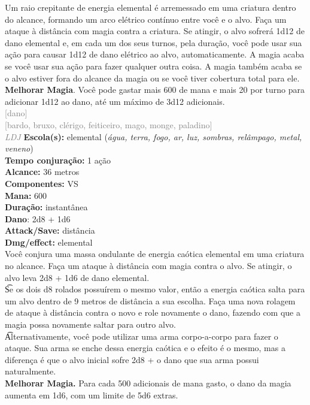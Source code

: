 \documentclass{RPG_Adventure}[2021/10/20]
\begin{document}
{\normalsize Um raio crepitante de energia elemental é arremessado em uma criatura dentro do alcance, formando um arco elétrico contínuo entre você e o alvo. Faça um ataque à distância com magia contra a criatura. Se atingir, o alvo sofrerá 1d12 de dano elemental e, em cada um dos seus turnos, pela duração, você pode usar sua ação para causar 1d12 de dano elétrico ao alvo, automaticamente. A magia acaba se você usar sua ação para fazer qualquer outra coisa. A magia também acaba se o alvo estiver fora do alcance da magia ou se você tiver cobertura total para ele.\\\t \textbf{Melhorar Magia}. Você pode gastar mais 600 de mana e mais 20 por turno para adicionar 1d12 ao dano, até um máximo de 3d12 adicionais.\\}
{\scriptsize \textcolor{gray}{[dano]\\}}
{\scriptsize \textcolor{gray}{[bardo, bruxo, clérigo, feiticeiro, mago, monge, paladino]\\}}
{\tiny \textcolor{gray}{\textit{LDJ}}}
{\small \t \textbf{Escola(s):} elemental (\textit{água, terra, fogo, ar, luz, sombras, relâmpago, metal, veneno})\\\t \textbf{Tempo conjuração:} 1 ação\\\t \textbf{Alcance:} 36 metros\\\t \textbf{Componentes:} VS\\\t \textbf{Mana:} 600\\\t \textbf{Duração:} instantânea\\\t \textbf{Dano}: 2d8 + 1d6\\\t \textbf{Attack/Save:} distância\\\t \textbf{Dmg/effect:} elemental\\}
{\normalsize Você conjura uma massa ondulante de energia caótica elemental em uma criatura no alcance. Faça um ataque à distância com magia contra o alvo. Se atingir, o alvo leva 2d8 + 1d6 de dano elemental.\\\t Se os dois d8 rolados possuírem o mesmo valor, então a energia caótica salta para um alvo dentro de 9 metros de distância a sua escolha. Faça uma nova rolagem de ataque à distância contra o novo e role novamente o dano, fazendo com que a magia possa novamente saltar para outro alvo.\\\t Alternativamente, você pode utilizar uma arma corpo-a-corpo para fazer o ataque. Sua arma se enche dessa energia caótica e o efeito é o mesmo, mas a diferença é que o alvo inicial sofre 2d8 + o dano que sua arma possui naturalmente.\\\t \textbf{Melhorar Magia.} Para cada 500 adicionais de mana gasto, o dano da magia aumenta em 1d6, com um limite de 5d6 extras.\\}
\end{document}

